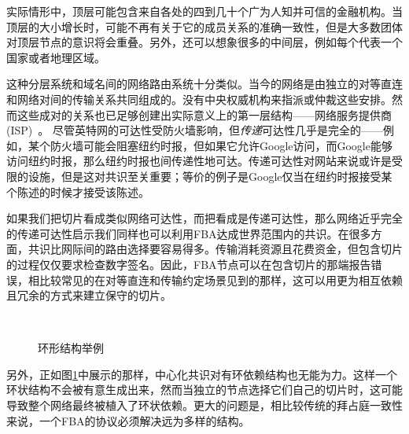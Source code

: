 实际情形中，顶层可能包含来自各处的四到几十个广为人知并可信的金融机构。当顶层的大小增长时，可能不再有关于它的成员关系的准确一致性，但是大多数团体对顶层节点的意识将会重叠。另外，还可以想象很多的中间层，例如每个代表一个国家或者地理区域。

这种分层系统和域名间的网络路由系统十分类似。当今的网络是由独立的对等直连和网络对间的传输关系共同组成的。没有中央权威机构来指派或仲裁这些安排。然而这些成对的关系也已足够创建出实际意义上的第一层结构——网络服务提供商(ISP)~\cite{peer_isp2010}。	尽管英特网的可达性受防火墙影响，但\textit{传递}可达性几乎是完全的——例如，某个防火墙可能会阻塞纽约时报，但如果它允许Google访问，而Google能够访问纽约时报，那么纽约时报也间传递性地可达。传递可达性对网站来说或许是受限的设施，但是这对共识至关重要；等价的例子是Google仅当在纽约时报接受某个陈述的时候才接受该陈述。

如果我们把{\quorum}切片看成类似网络可达性，而把{\quorum}看成是传递可达性，那么网络近乎完全的传递可达性启示我们同样也可以利用FBA达成世界范围内的共识。在很多方面，共识比网际间的路由选择要容易得多。传输消耗资源且花费资金，但包含切片的过程仅仅要求检查数字签名。因此，FBA节点可以在包含切片的那端报告错误，相比较常见的在对等直连和传输约定场景见到的那样，这可以用更为相互依赖且冗余的方式来建立保守的切片。


\begin{figure}
\centering
{}\\
\caption{环形{\quorum}结构举例}
\label{fig:cycle}
\end{figure}

另外，正如图\ref{fig:cycle}中展示的那样，中心化共识对有环依赖结构也无能为力。这样一个环状结构不会被有意生成出来，然而当独立的节点选择它们自己的切片时，这可能导致整个网络最终被植入了环状依赖。更大的问题是，相比较传统的拜占庭一致性来说，一个FBA的协议必须解决远为多样的{\quorum}结构。